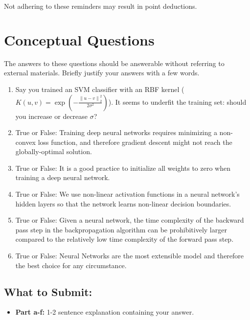 \documentclass{article}
\begin{document}
Not adhering to these reminders may result in point deductions. \\

\clearpage{}

\section*{Conceptual Questions}

\begin{aprob}
    The answers to these questions should be answerable without referring to external materials.
    Briefly justify your answers with a few words.
    \begin{enumerate}
        \item {} Say you trained an SVM classifier with an RBF kernel ($K(u, v) = \exp\left(-\frac{\left\|u-v\right\|^2_2}{2\sigma^2}\right)$). It seems to underfit the training set: should you increase or decrease $\sigma$?
        \item {} True or False:   Training deep neural networks requires minimizing a non-convex loss function, and therefore gradient descent might not reach the globally-optimal solution.
        \item {} True or False: It is a good practice to initialize all weights to zero when training a deep neural network.
        \item {} True or False:   We use non-linear activation functions in a neural network’s hidden layers so that the network learns non-linear decision boundaries.
        \item {} True or False: Given a neural network, the time complexity of the backward pass step in the backpropagation algorithm can be prohibitively larger compared to the relatively low time complexity of the forward pass step.
        \item {} True or False: Neural Networks are the most extensible model and therefore the best choice for any circumstance.
    \end{enumerate}
    
    \subsection*{What to Submit:}
    \begin{itemize}
        \item \textbf{Part a-f:} 1-2 sentence explanation containing your answer.
    \end{itemize}
\end{aprob}
\end{document}

